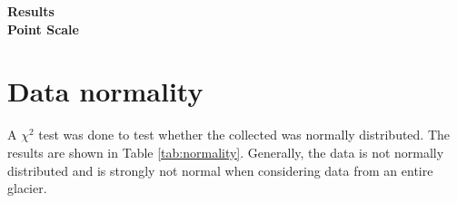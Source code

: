 \documentclass[12pt]{article}
\begin{document}

\begin{center}
\Large \textbf{Results\\ Point Scale}
\end{center}


\tableofcontents
\pagebreak

\section{Data normality}

A $\chi^2$ test was done to test whether the collected was normally distributed. The results are shown in Table \ref{tab:normality}. Generally, the data is not normally distributed and is strongly not normal when considering data from an entire glacier.
\end{document}
